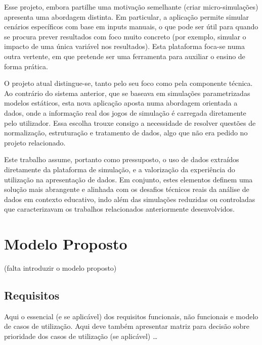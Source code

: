 Esse projeto, embora partilhe uma motivação semelhante (criar micro-simulações) apresenta uma abordagem distinta. Em particular, a aplicação permite simular cenários específicos com base em inputs manuais, o que pode ser útil para quando se procura prever resultados com foco muito concreto (por exemplo, simular o impacto de uma única variável nos resultados). Esta plataforma foca-se numa outra vertente, em que pretende ser uma ferramenta para auxiliar o ensino de forma prática.

O projeto atual distingue-se, tanto pelo seu foco como pela componente técnica. Ao contrário do sistema anterior, que se baseava em simulações parametrizadas modelos estáticos, esta nova aplicação aposta numa abordagem orientada a dados, onde a informação real dos jogos de simulação é carregada diretamente pelo utilizador. Essa escolha trouxe consigo a necessidade de resolver questões de normalização, estruturação e tratamento de dados, algo que não era pedido no projeto relacionado.

Este trabalho assume, portanto como pressuposto, o uso de dados extraídos diretamente da plataforma de simulação, e a valorização da experiência do utilização na apresentação de dados. Em conjunto, estes elementos definem uma solução mais abrangente e alinhada com os desafios técnicos reais da análise de dados em contexto educativo, indo além das simulações reduzidas ou controladas que caracterizavam os trabalhos relacionados anteriormente desenvolvidos.

\chapter{Modelo Proposto}
\label{ch:modeloProposto}

(falta introduzir o modelo proposto)


\section{Requisitos}
\label{sec:requisitos}

Aqui o essencial (e se aplicável) dos requisitos funcionais, não funcionais e modelo de casos de utilização. Aqui deve também apresentar matriz para decisão sobre prioridade dos casos de utilização (se aplicável) \ldots


